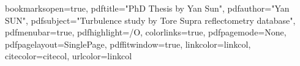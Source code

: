 \usepackage{color}



\usepackage{hyperref}
\hypersetup
{
bookmarksopen=true,
pdftitle="PhD Thesis by Yan Sun",
pdfauthor="Yan SUN",
pdfsubject="Turbulence study by Tore Supra reflectometry database", %
pdfmenubar=true, %
pdfhighlight=/O, %
colorlinks=true, %
pdfpagemode=None, %
pdfpagelayout=SinglePage, %
pdffitwindow=true, %
linkcolor=linkcol, %
citecolor=citecol, %
urlcolor=linkcol %
}


\setcounter{secnumdepth}{3}
\setcounter{tocdepth}{2}



\newcommand{\pd}[2]{\frac{\partial #1}{\partial #2}}
\def\abs{\operatorname{abs}}
\def\argmax{\operatornamewithlimits{arg\,max}}
\def\argmin{\operatornamewithlimits{arg\,min}}
\def\diag{\operatorname{Diag}}
\newcommand{\eqRef}[1]{(\ref{#1})}

\usepackage{rotating}                    %
\usepackage{fancyhdr}                    %



